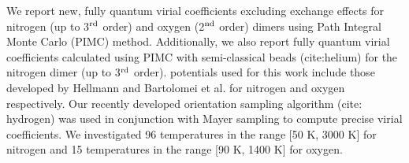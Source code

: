 We report new, fully quantum virial coefficients excluding exchange effects for nitrogen (up to 3${\rm ^{rd}}$ order) and oxygen (2${\rm ^{nd}}$ order) dimers using Path Integral Monte Carlo (PIMC) method. Additionally, we also report fully quantum virial coefficients calculated using PIMC with semi-classical beads (cite:helium) for the nitrogen dimer (up to 3${\rm ^{rd}}$ order). \AbInitio{} potentials used for this work include those developed by Hellmann \cite{Hellmann2013} and Bartolomei et al. \cite{Bartolomei2010} for nitrogen and oxygen respectively. Our recently developed orientation sampling algorithm (cite: hydrogen) was used in conjunction with Mayer sampling \cite{Singh2004} to compute precise virial coefficients. We investigated 96 temperatures in the range [50 K, 3000 K] for nitrogen and 15 temperatures in the range [90 K, 1400 K] for oxygen.
